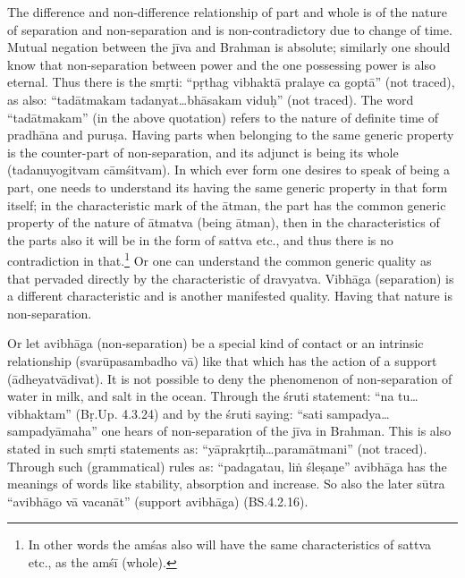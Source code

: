 
The difference and non-difference relationship of part and whole is of the nature of separation and non-separation and is non-contradictory due to change of time. Mutual negation between the jīva and Brahman is absolute; similarly one should know that non-separation between power and the one possessing power is also eternal. Thus there is the smṛti: “pṛthag vibhaktā pralaye ca goptā” (not traced), as also: “tadātmakam tadanyat…bhāsakam viduḥ” (not traced). The word “tadātmakam” (in the above quotation) refers to the nature of definite time of pradhāna and puruṣa. Having parts when belonging to the same generic property is the counter-part of non-separation, and its adjunct is being its whole (tadanuyogitvam cāmśitvam). In which ever form one desires to speak of being a part, one needs to understand its having the same generic property in that form itself; in the  characteristic mark of the ātman, the part has the common generic property of the nature of ātmatva (being ātman), then in the characteristics of the parts also it will be in the form of sattva etc., and thus there is no contradiction in that.\footnote{In other words the amśas also will have the same characteristics of sattva etc., as the amśī (whole).} Or one can understand the common generic quality as that pervaded directly by the characteristic of dravyatva. Vibhāga (separation) is a different characteristic and is another manifested quality. Having that nature is non-separation. 

Or let avibhāga (non-separation) be a special kind of contact or an intrinsic relationship (svarūpasambadho vā) like that which has the action of a support (ādheyatvādivat). It is not possible to deny the phenomenon of non-separation of water in milk, and salt in the ocean. Through the śruti statement:  “na tu…vibhaktam” (Bṛ.Up. 4.3.24) and by the śruti saying: “sati sampadya…sampadyāmaha” one hears of non-separation of the jīva in Brahman. This is also stated in such smṛti statements as: “yāprakṛtiḥ…paramātmani” (not traced).   Through such (grammatical) rules as: “padagatau, liṅ śleṣaṇe” avibhāga has the meanings of words like stability, absorption and increase. So also the later sūtra “avibhāgo vā vacanāt” (support avibhāga) (BS.4.2.16).

